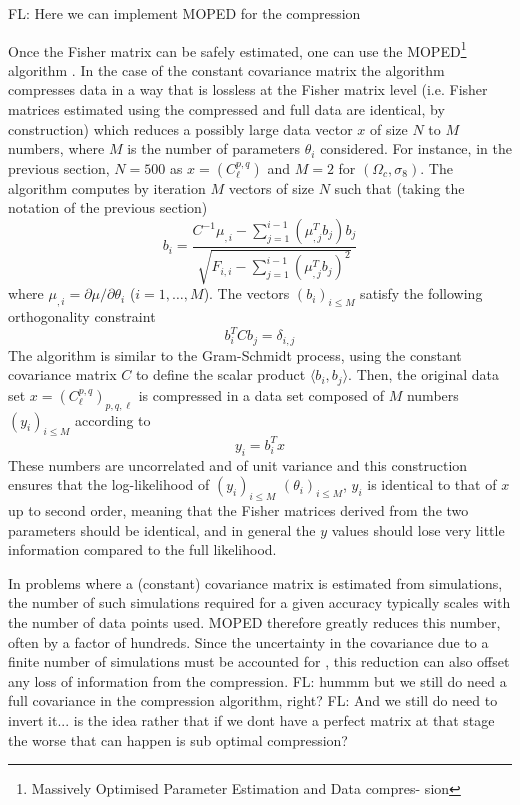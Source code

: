 \documentclass[twocolumn,twocolappendix,nofootinbib,iop]{openjournal}
\newcommand{\FrL}[1]{{\color{cyan}FL: #1}}
\begin{document}
\FrL{Here we can implement MOPED for the compression}

Once the Fisher matrix can be safely estimated, one can use the MOPED\footnote{Massively Optimised Parameter Estimation and Data compres-
sion} algorithm \citep{2000MNRAS.317..965H,2016PhRvD..93h3525Z, 2017MNRAS.472.4244H}. In the case of the constant covariance matrix the algorithm compresses data in a way that is lossless at the Fisher matrix level (i.e. Fisher matrices estimated using the compressed and full data are identical, by construction)  which reduces a possibly large data vector $x$ of size $N$ to $M$ numbers, where $M$ is the number of parameters $\theta_i$ considered. For instance, in the previous section, $N=500$ as $x=(C_\ell^{p,q})$ and $M=2$ for $(\Omega_c,\sigma_8)$. The algorithm computes by iteration $M$ vectors of size $N$ such that (taking the notation of the previous section)
\begin{equation}
    b_i = \frac{C^{-1}\mu_{,i}-\sum_{j=1}^{i-1}(\mu_{,j}^T b_j)b_j}{\sqrt{F_{i,i}-\sum_{j=1}^{i-1}(\mu_{,j}^T b_j)^2}}
\end{equation}
where $\mu_{,i}=\partial \mu/\partial \theta_i$ ($i=1,\dots,M$). The vectors $(b_i)_{i\leq M}$ satisfy the following orthogonality constraint
\begin{equation}
    b_i^T C b_j = \delta_{i,j}
\end{equation}
The algorithm is similar to the Gram-Schmidt process, using the constant covariance matrix $C$ to define the scalar product $\langle b_i, b_j\rangle$. Then, the original data set $x=(C_\ell^{p,q})_{p,q,\ell}$ is compressed in a data set composed of $M$ numbers $(y_i)_{i\leq M}$ according to
\begin{equation}
    y_i = b_i^T x
\end{equation}
These numbers are uncorrelated and of unit variance and this construction ensures that the log-likelihood of $(y_i)_{i\leq M}$  $(\theta_i)_{i\leq M}$, $y_i$ is identical to that of $x$ up to second order, meaning that the Fisher matrices derived from the two parameters should be identical, and in general the $y$ values should lose very little information compared to the full likelihood.

In problems where a (constant) covariance matrix is estimated from simulations, the number of such simulations required for a given accuracy typically scales with the number of data points used. 
MOPED therefore greatly reduces this number, often by a factor of hundreds. Since the uncertainty in the covariance due to a finite number of simulations must be accounted for \citep{2018MNRAS.473.2355S,2007A&A...464..399H}, this reduction can also offset any loss of information from the compression. \FrL{hummm but we still do need a full covariance in the compression algorithm, right?} \FrL{And we still do need to invert it... is the idea rather that if we dont have a perfect matrix at that stage the worse that can happen is sub optimal compression?}
\end{document}
